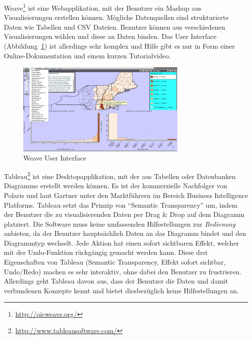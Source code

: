 \documentclass[
	headsepline,
	footsepline,
	fontsize=12pt,
	bibliography=totoc
]{scrbook}
\begin{document}

Weave\footnote{\url{http://oicweave.org/}} ist eine Webapplikation, mit der Benutzer ein Mashup aus Visualisierungen erstellen können. Mögliche Datenquellen sind strukturierte Daten wie Tabellen und CSV Dateien. Benutzer können aus verschiedenen Visualisierungen wählen und diese an Daten binden. Das User Interface (Abbildung~\ref{figure:weave}) ist allerdings sehr komplex und Hilfe gibt es nur in Form einer Online-Dokumentation und einem kurzen Tutorialvideo.

\begin{figure}[htbp]
   \centering
   \includegraphics[width=0.75\textwidth]{images/verwandte_arbeiten-weave.png}
   \caption{Weave User Interface}
   \label{figure:weave}
\end{figure}


Tableau\footnote{\url{http://www.tableausoftware.com/}} ist eine Desktopapplikation, mit der aus Tabellen oder Datenbanken Diagramme erstellt werden können. Es ist der kommerzielle Nachfolger von Polaris \cite{Stolte2000} und laut Gartner \cite{Gartner2013} unter den Marktführern im Bereich Business Intelligence Platforms. Tableau setzt das Prinzip von \enquote{Semantic Transparency} um, indem der Benutzer die zu visualisierenden Daten per Drag \& Drop auf dem Diagramm platziert. Die Software muss keine umfassenden Hilfestellungen zur \emph{Bedienung} anbieten, da der Benutzer hauptsächlich Daten an das Diagramm bindet und den Diagrammtyp wechselt. Jede Aktion hat einen sofort sichtbaren Effekt, welcher mit der Undo-Funktion rückgängig gemacht werden kann. Diese drei Eigenschaften von Tableau (Semantic Transparency, Effekt sofort sichtbar, Undo/Redo) machen es sehr interaktiv, ohne dabei den Benutzer zu frustrieren. Allerdings geht Tableau davon aus, dass der Benutzer die Daten und damit verbundenen Konzepte kennt und bietet diesbezüglich keine Hilfestellungen an.
\end{document}
